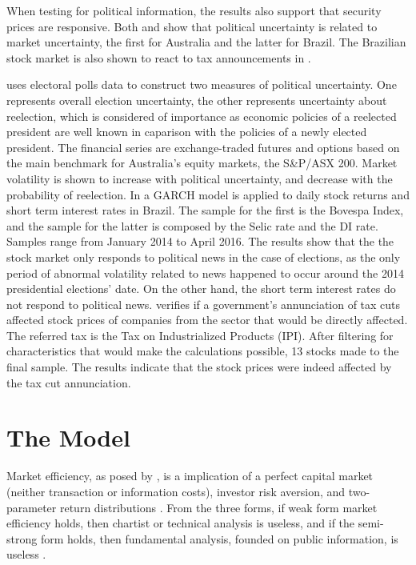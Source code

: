 \documentclass[cic,tc, english]{iiufrgs}
\begin{document}
    When testing for political information, the results also support that security prices are responsive. Both \citet{smales2015} and \citet{marquessantos2016} show that political uncertainty is related to market uncertainty, the first for Australia and the latter for Brazil. The Brazilian stock market is also shown to react to tax announcements in \citet{gabrielribeiro2013}.

    \citet{smales2015} uses electoral polls data to construct two measures of political uncertainty. One represents overall election uncertainty, the other represents uncertainty about reelection, which is considered of importance as economic policies of a reelected president are well known in caparison with the policies of a newly elected president. The financial series are exchange-traded futures and options based on the main benchmark for Australia's equity markets, the S\&P/ASX 200. Market volatility is shown to increase with political uncertainty, and decrease with the probability of reelection.
    In \citet{marquessantos2016} a GARCH model is applied to daily stock returns and short term interest rates in Brazil. The sample for the first is the Bovespa Index, and the sample for the latter is composed by the Selic rate and the DI rate. Samples range from January 2014 to April 2016. The results show that the the stock market only responds to political news in the case of elections, as the only period of abnormal volatility related to news happened to occur around the 2014 presidential elections' date. On the other hand, the short term interest rates do not respond to political news.
    \citet{gabrielribeiro2013} verifies if a government's annunciation of tax cuts affected stock prices of companies from the sector that would be directly affected. The referred tax is the Tax on Industrialized Products (IPI). After filtering for characteristics that would make the calculations possible, 13 stocks made to the final sample. The results indicate that the stock prices were indeed affected by the tax cut annunciation.

\chapter{The Model} \label{chapter_model}

    Market efficiency, as posed by \citet{fama1970}, is a implication of a perfect capital market (neither transaction or information costs), investor risk aversion, and two-parameter return distributions \citet{famamcbeth1973}. From the three forms, if weak form market efficiency holds, then chartist or technical analysis is useless, and if the semi-strong form holds, then fundamental analysis, founded on public information, is useless \citet{oprean2012}.
\end{document}
